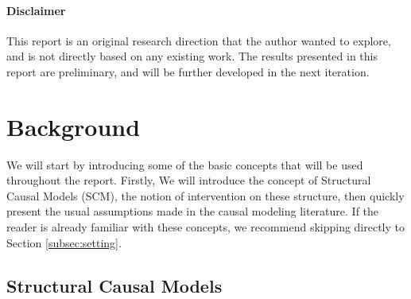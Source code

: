 \documentclass{article}
\begin{document}
\paragraph{Disclaimer} This report is an original research direction that the author wanted to
explore, and is not directly based on any existing work. The results presented
in this report are preliminary, and will be further developed in the next
iteration.

\section{Background}\label{subsec:background}

We will start by introducing some of the basic concepts that will be used
throughout the report. Firstly, We will introduce the concept of Structural
Causal Models (SCM), the notion of intervention on these structure, then
quickly present the usual assumptions made in the causal modeling literature.
If the reader is already familiar with these concepts, we recommend skipping
directly to Section \ref{subsec:setting}.

\subsection{Structural Causal Models}
\end{document}
